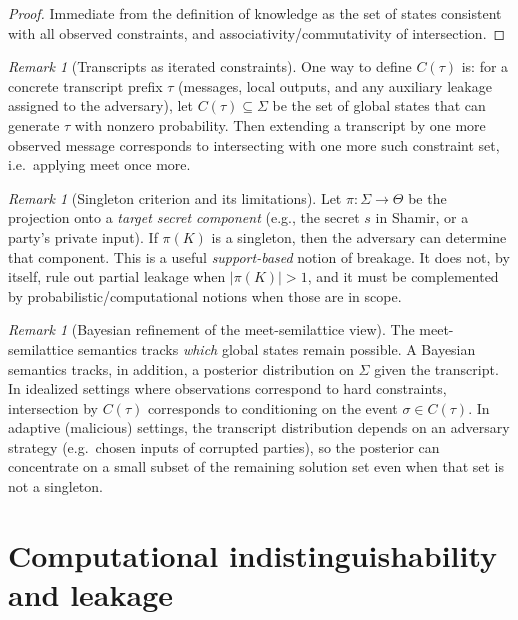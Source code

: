 \documentclass[11pt,a4paper]{article}
\theoremstyle{definition}
\theoremstyle{remark}
\newtheorem{remark}[theorem]{Remark}
\begin{document}
\begin{proof}
Immediate from the definition of knowledge as the set of states consistent with all observed constraints, and associativity/commutativity of intersection.
\end{proof}

\begin{remark}[Transcripts as iterated constraints]
One way to define \(C(\tau)\) is: for a concrete transcript prefix \(\tau\) (messages, local outputs, and any auxiliary leakage assigned to the adversary), let \(C(\tau)\subseteq \Sigma\) be the set of global states that can generate \(\tau\) with nonzero probability. Then extending a transcript by one more observed message corresponds to intersecting with one more such constraint set, i.e.\ applying meet once more.
\end{remark}

\begin{remark}[Singleton criterion and its limitations]
\label{rem:singleton-criterion}
Let \(\pi : \Sigma \to \Theta\) be the projection onto a \emph{target secret component} (e.g., the secret \(s\) in Shamir, or a party's private input). If \(\pi(K)\) is a singleton, then the adversary can determine that component. This is a useful \emph{support-based} notion of breakage. It does not, by itself, rule out partial leakage when \(|\pi(K)|>1\), and it must be complemented by probabilistic/computational notions when those are in scope.
\end{remark}

\begin{remark}[Bayesian refinement of the meet-semilattice view]
The meet-semilattice semantics tracks \emph{which} global states remain possible. A Bayesian semantics tracks, in addition, a posterior distribution on \(\Sigma\) given the transcript. In idealized settings where observations correspond to hard constraints, intersection by \(C(\tau)\) corresponds to conditioning on the event \(\sigma\in C(\tau)\). In adaptive (malicious) settings, the transcript distribution depends on an adversary strategy (e.g.\ chosen inputs of corrupted parties), so the posterior can concentrate on a small subset of the remaining solution set even when that set is not a singleton.
\end{remark}

\section{Computational indistinguishability and leakage}
\label{sec:computational-security}
\end{document}
